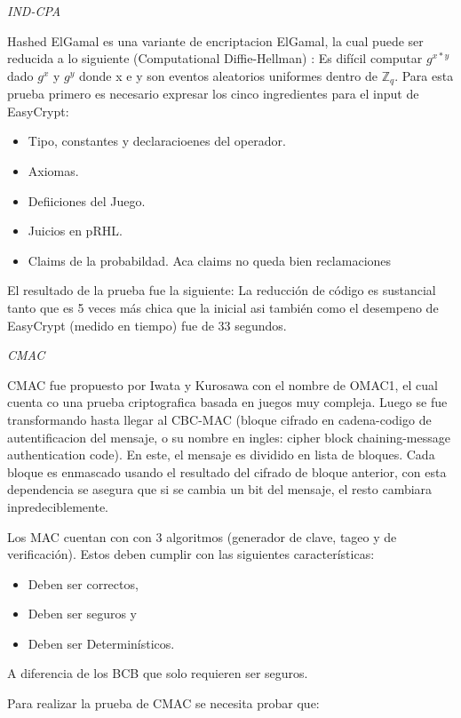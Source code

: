 \documentclass[runningheads,a4paper]{llncs}
\begin{document}
\centerline{\emph{IND-CPA}}


Hashed ElGamal es una variante de encriptacion ElGamal, la cual puede ser reducida a lo siguiente (Computational Diffie-Hellman) : Es difícil computar $g^{x*y}$ dado $g^x$ y $g^y$ donde x e y son eventos aleatorios uniformes dentro de $\mathbb{Z}_q$.
Para esta prueba primero es necesario expresar los cinco ingredientes para el input de EasyCrypt:
\begin{itemize}
	\item Tipo, constantes y declaracioenes del operador.
	\item Axiomas.
	\item Defiiciones del Juego.
	\item Juicios en pRHL.
	\item Claims de la probabildad. Aca claims no queda bien reclamaciones
\end{itemize}

El resultado de la prueba fue la siguiente: La reducción de código es sustancial tanto que es 5 veces más chica que la inicial asi también como el desempeno de EasyCrypt (medido en tiempo) fue de 33 segundos.\cite{article3}



\centerline{\emph{CMAC}}
CMAC fue propuesto por Iwata y Kurosawa con el nombre de OMAC1, el cual cuenta co una prueba criptografica basada en juegos muy compleja. Luego se fue transformando hasta llegar al CBC-MAC (bloque cifrado en cadena-codigo de autentificacion del mensaje, o su nombre en ingles: cipher block chaining-message authentication code). En este, el mensaje es dividido en lista de bloques. Cada bloque es enmascado usando el resultado del cifrado de bloque anterior, con esta dependencia se asegura que si se cambia un bit  del mensaje, el resto cambiara inpredeciblemente.

Los MAC cuentan con con 3 algoritmos (generador de clave, tageo y de verificación). Estos deben cumplir con las siguientes características: 
\begin{itemize}
	\item Deben ser correctos,
	\item Deben ser seguros y
	\item Deben ser Determinísticos.
\end{itemize}

A diferencia de los BCB que solo requieren ser seguros.

Para realizar la prueba de CMAC se necesita probar que:
\end{document}

